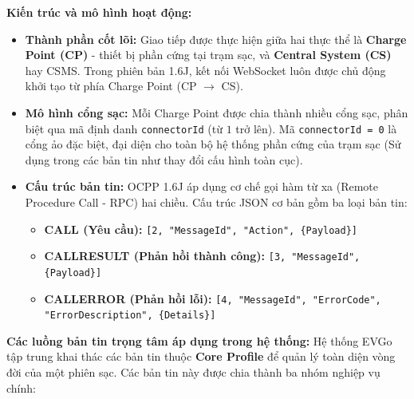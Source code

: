 \textbf{Kiến trúc và mô hình hoạt động:}
\begin{itemize}
    \item \textbf{Thành phần cốt lõi:} Giao tiếp được thực hiện giữa hai thực thể là \textbf{Charge Point (CP)} - thiết bị phần cứng tại trạm sạc, và \textbf{Central System (CS)} hay CSMS. Trong phiên bản 1.6J, kết nối WebSocket luôn được chủ động khởi tạo từ phía Charge Point (CP $\rightarrow$ CS).
    \item \textbf{Mô hình cổng sạc:} Mỗi Charge Point được chia thành nhiều cổng sạc, phân biệt qua mã định danh \texttt{connectorId} (từ $1$ trở lên). Mã \texttt{connectorId = 0} là cổng ảo đặc biệt, đại diện cho toàn bộ hệ thống phần cứng của trạm sạc (Sử dụng trong các bản tin như thay đổi cấu hình toàn cục).
    \item \textbf{Cấu trúc bản tin:} OCPP 1.6J áp dụng cơ chế gọi hàm từ xa (Remote Procedure Call - RPC) hai chiều. Cấu trúc JSON cơ bản gồm ba loại bản tin:
    \begin{itemize}
        \item \textbf{CALL (Yêu cầu):} \texttt{[2, "MessageId", "Action", \{Payload\}]}
        \item \textbf{CALLRESULT (Phản hồi thành công):} \texttt{[3, "MessageId", \{Payload\}]}
        \item \textbf{CALLERROR (Phản hồi lỗi):} \texttt{[4, "MessageId", "ErrorCode",} \\
        \texttt{"ErrorDescription", \{Details\}]}    
    \end{itemize}
\end{itemize}

\textbf{Các luồng bản tin trọng tâm áp dụng trong hệ thống:}
Hệ thống EVGo tập trung khai thác các bản tin thuộc \textbf{Core Profile} để quản lý toàn diện vòng đời của một phiên sạc. Các bản tin này được chia thành ba nhóm nghiệp vụ chính:

